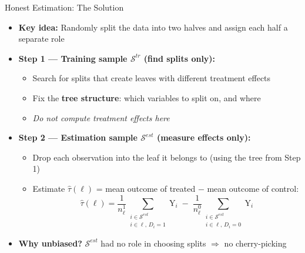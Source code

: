 \documentclass[hyperref={pdfpagelabels=false}]{beamer}
\begin{document}
\begin{frame}{Honest Estimation: The Solution}
	\begin{itemize}
		\item \textbf{Key idea:} Randomly split the data into two halves and assign each half a separate role
		\vspace{0.3cm}
		\item \textbf{Step 1 --- Training sample $\mathcal{S}^{tr}$ (find splits only):}
		\vspace{0.2cm}
		\begin{itemize}
			\item Search for splits that create leaves with different treatment effects
			\vspace{0.2cm}
			\item Fix the \textbf{tree structure}: which variables to split on, and where
			\vspace{0.2cm}
			\item \textit{Do not compute treatment effects here}
		\end{itemize}
		\vspace{0.3cm}
		\item \textbf{Step 2 --- Estimation sample $\mathcal{S}^{est}$ (measure effects only):}
		\vspace{0.2cm}
		\begin{itemize}
			\item Drop each observation into the leaf it belongs to (using the tree from Step 1)
			\vspace{0.2cm}
			\item Estimate $\hat{\tau}(\ell)$ = mean outcome of treated $-$ mean outcome of control:
			\begin{equation*}
				\hat{\tau}(\ell) = \frac{1}{n^{1}_\ell} \sum_{\substack{i \in \mathcal{S}^{est}\\ i \in \ell,\, D_i=1}} \mathrm{Y}_i \;-\; \frac{1}{n^{0}_\ell} \sum_{\substack{i \in \mathcal{S}^{est}\\ i \in \ell,\, D_i=0}} \mathrm{Y}_i
			\end{equation*}
		\end{itemize}
		\vspace{0.2cm}
		\item \textbf{Why unbiased?} $\mathcal{S}^{est}$ had no role in choosing splits $\Rightarrow$ no cherry-picking
	\end{itemize}
\end{frame}
\end{document}

